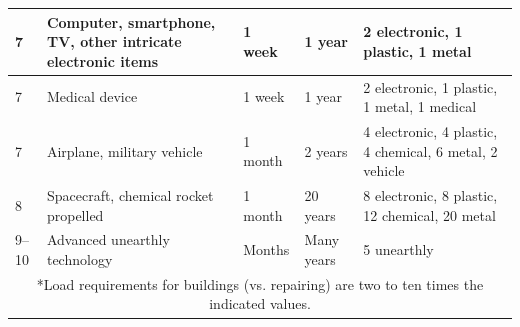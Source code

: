 \begin{longtable}{| p{3cm} | p{3cm} | p{3cm} | p{3cm} | p{3cm} |}
7 & Computer, smartphone, TV, other intricate electronic items  & 1 week  & 1 year  & 2 electronic, 1 plastic, 1 metal  \\ \hline
7 & Medical device  & 1 week  & 1 year  & 2 electronic, 1 plastic, 1 metal, 1 medical  \\ \hline
7 & Airplane, military vehicle & 1 month & 2 years  & 4 electronic, 4 plastic, 4 chemical, 6 metal, 2 vehicle  \\ \hline
8 & Spacecraft, chemical rocket propelled  & 1 month  & 20 years  & 8 electronic, 8 plastic, 12 chemical, 20 metal  \\ \hline
9–10  & Advanced unearthly technology  & Months  & Many years  & 5 unearthly  \\ \hline
\multicolumn{5}{|c|}{*Load requirements for buildings (vs. repairing) are two to ten times the indicated values. }
\end{longtable}

